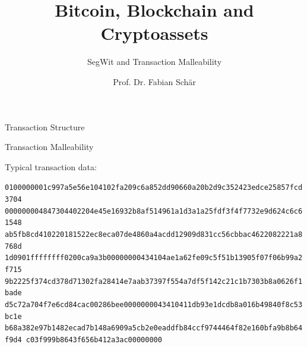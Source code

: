 \documentclass[handout]{beamer}
\title{Bitcoin, Blockchain and Cryptoassets}
\subtitle{SegWit and Transaction Malleability}
\author{Prof. Dr. Fabian Schär}
\institute{University of Basel}
\begin{document}
\thispagestyle{empty}
\begin{frame}[noframenumbering]
	\titlepage
\end{frame}

\begin{frame}{Transaction Structure}

\begin{figure}
		
\end{figure}
\vspace{1em}


\end{frame}

\begin{frame}{Transaction Malleability}

Typical transaction data:\\
\begin{scriptsize}
	\texttt{\textcolor{black!30}{0100000001c997a5e56e104102fa209c6a852dd90660a20b2d9c352423edce25857fcd3704
		00000000}{\alert{4847304402204e45e16932b8af514961a1d3a1a25fdf3f4f7732e9d624c6c61548
		ab5fb8cd410220181522ec8eca07de4860a4acdd12909d831cc56cbbac4622082221a8768d
		1d0901}}\textcolor{black!30}{ffffffff0200ca9a3b00000000434104ae1a62fe09c5f51b13905f07f06b99a2f715
		9b2225f374cd378d71302fa28414e7aab37397f554a7df5f142c21c1b7303b8a0626f1bade
		d5c72a704f7e6cd84cac00286bee0000000043410411db93e1dcdb8a016b49840f8c53bc1e
		b68a382e97b1482ecad7b148a6909a5cb2e0eaddfb84ccf9744464f82e160bfa9b8b64f9d4
		c03f999b8643f656b412a3ac00000000}}
\end{scriptsize}
	\vspace{1em}
	
\end{frame}
\end{document}

